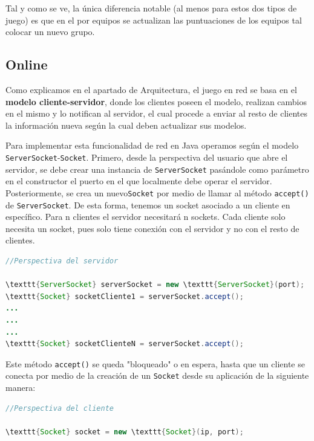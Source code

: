 \documentclass[../DocumentoOficial.tex]{subfiles}
\begin{document}
Tal y como se ve, la única diferencia notable (al menos para estos dos tipos de juego) es que en el por equipos se actualizan las puntuaciones de los equipos tal colocar un nuevo grupo.

\newpage

\subsection{Online}

Como explicamos en el apartado de Arquitectura, el juego en red se basa en el \textbf{modelo cliente-servidor}, donde los clientes poseen el modelo, realizan cambios en el mismo y lo notifican al servidor, el cual procede a enviar al resto de clientes la información nueva según la cual deben actualizar sus modelos.

Para implementar esta funcionalidad de red en Java operamos según el modelo \texttt{ServerSocket}-\texttt{Socket}. Primero, desde la perspectiva del usuario que abre el servidor, se debe crear una instancia de \texttt{ServerSocket} pasándole como parámetro en el constructor el puerto en el que localmente debe operar el servidor. Posteriormente, se crea un nuevo\texttt{Socket} por medio de llamar al método \texttt{accept()} de \texttt{ServerSocket}. De esta forma, tenemos un socket asociado a un cliente en específico. Para n clientes el servidor necesitará n sockets. Cada cliente solo necesita un socket, pues solo tiene conexión con el servidor y no con el resto de clientes.

\begin{lstlisting}[frame=single, language=Java]
//Perspectiva del servidor

\texttt{ServerSocket} serverSocket = new \texttt{ServerSocket}(port);
\texttt{Socket} socketCliente1 = serverSocket.accept();
...
...
...
\texttt{Socket} socketClienteN = serverSocket.accept();

\end{lstlisting}


Este método \texttt{accept()} se queda "bloqueado" o en espera, hasta que un cliente se conecta por medio de la creación de un \texttt{Socket} desde su aplicación de la siguiente manera:

\begin{lstlisting}[frame=single, language=Java]
//Perspectiva del cliente

\texttt{Socket} socket = new \texttt{Socket}(ip, port);

\end{lstlisting}
\end{document}

